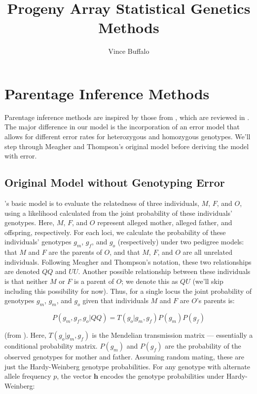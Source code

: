 \documentclass[11pt]{article}
\title{
Progeny Array Statistical Genetics Methods
}
\author{
Vince Buffalo
}
\begin{document}
\maketitle

\section{Parentage Inference Methods}

Parentage inference methods are inspired by those from \citet{meagher1986},
which are reviewed in \citet{marshall1998}. The major difference in our model
is the incorporation of an error model that allows for different error rates
for heterozygous and homozygous genotypes. We'll step through Meagher and
Thompson's original model before deriving the model with error.

\subsection{Original Model without Genotyping Error}

\citeauthor{meagher1986}'s basic model is to evaluate the relatedness of three
individuals, $M$, $F$, and $O$, using a likelihood calculated from the joint
probability of these individuals' genotypes. Here, $M$, $F$, and $O$ represent
alleged mother, alleged father, and offspring, respectively. For each loci, we
calculate the probability of these individuals' genotypes $g_m$, $g_f$, and
$g_o$ (respectively) under two pedigree models: that $M$ and $F$ are the
parents of $O$, and that $M$, $F$, and $O$ are all unrelated individuals.
Following Meagher and Thompson's notation, these two relationships are denoted
$QQ$ and $UU$. Another possible relationship between these individuals is that
neither $M$ or $F$ is a parent of $O$; we denote this as $QU$ (we'll skip
including this possibility for now). Thus, for a single locus the joint
probability of genotypes $g_m$, $g_m$, and $g_o$ given that individuals $M$ and
$F$ are $O$'s parents is:

$$ P(g_m, g_f, g_o | QQ) = T(g_o | g_m, g_f) P(g_m) P(g_f) $$

(from \citealt{meagher1986}). Here, $T(g_o | g_m, g_f)$ is the
Mendelian transmission matrix --- essentially a conditional probability matrix.
$P(g_m)$ and $P(g_f)$ are the probability of the observed genotypes for mother
and father. Assuming random mating, these are just the Hardy-Weinberg genotype
probabilities. For any genotype with alternate allele frequency $p$, the vector
$\bm{h}$ encodes the genotype probabilities under Hardy-Weinberg:
\end{document}
